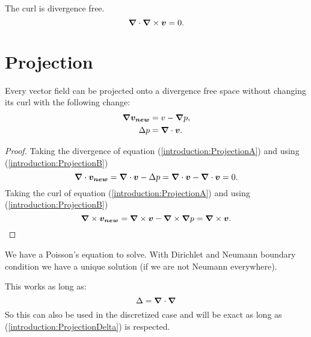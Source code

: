 \begin{property}
The curl is divergence free.
 \begin{equation}
  {\boldsymbol {\nabla}}\cdot {\boldsymbol {\nabla}} \times {\boldsymbol {v}}=0.
 \end{equation}
\end{property}

\section{Projection}
\label{introduction:projection}
\begin{property}
 Every vector field can be projected onto a divergence free space without changing its curl with the following change:
\begin{align}
 {\boldsymbol {\nabla}}{\boldsymbol {v_{new}}}&=v-{\boldsymbol {\nabla}}p \label{introduction:ProjectionA},\\
 \Delta p&={\boldsymbol {\nabla}} \cdot {\boldsymbol {v}} \label{introduction:ProjectionB}.
\end{align}
\end{property}
\begin{proof}
  Taking the divergence of equation (\ref{introduction:ProjectionA}) and using (\ref{introduction:ProjectionB})
  \begin{equation}
   {\boldsymbol {\nabla}}\cdot{\boldsymbol {v_{new}}}={\boldsymbol {\nabla}}\cdot{\boldsymbol {v}}-\Delta p={\boldsymbol {\nabla}}\cdot{\boldsymbol {v}}-{\boldsymbol {\nabla}}\cdot{\boldsymbol {v}}=0.
  \end{equation}
  Taking the curl of equation (\ref{introduction:ProjectionA}) and using (\ref{introduction:ProjectionB})
  \begin{equation}
   {\boldsymbol {\nabla}}\times{\boldsymbol {v_{new}}}={\boldsymbol {\nabla}}\times{\boldsymbol {v}}-{\boldsymbol {\nabla}}\times{\boldsymbol {\nabla}} p={\boldsymbol {\nabla}}\times{\boldsymbol {v}}.
  \end{equation}
  \end{proof}
  
   \begin{remark}
    We have a Poisson's equation to solve. With Dirichlet and Neumann boundary condition we have a unique solution (if we are not
    Neumann everywhere).	
   \end{remark}

  
  \begin{remark}
 This works as long as:
 \begin{equation}
  \Delta={\boldsymbol {\nabla}}\cdot {\boldsymbol {\nabla}}\label{introduction:ProjectionDelta}
 \end{equation}
 So this can also be used in the discretized case and will be exact as long as (\ref{introduction:ProjectionDelta}) is respected.
 \end{remark}


